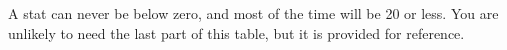 
\newcommand{\g}[1]{\multicolumn{1}{|^Y}{#1}}


A stat can never be below zero, and most of the time will be 20 or less. You are unlikely to need the last part of this table, but it is provided for reference.

